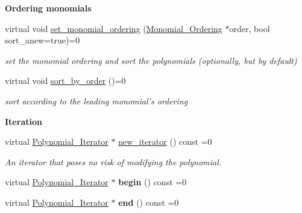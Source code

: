 \begin{Indent}\textbf{ Ordering monomials}\par
\begin{DoxyCompactItemize}
\item 
virtual void \hyperlink{class_abstract___polynomial_ad783804725a64f09fff6eeec058afe98}{set\+\_\+monomial\+\_\+ordering} (\hyperlink{class_monomial___ordering}{Monomial\+\_\+\+Ordering} $\ast$order, bool sort\+\_\+anew=true)=0
\begin{DoxyCompactList}\small\item\em set the monomial ordering and sort the polynomials (optionally, but by default) \end{DoxyCompactList}\item 
virtual void \hyperlink{class_abstract___polynomial_a1fcdd29c324c660ea935197c39e682f2}{sort\+\_\+by\+\_\+order} ()=0
\begin{DoxyCompactList}\small\item\em sort according to the leading monomial's ordering \end{DoxyCompactList}\end{DoxyCompactItemize}
\end{Indent}
\begin{Indent}\textbf{ Iteration}\par
\begin{DoxyCompactItemize}
\item 
\mbox{\label{class_abstract___polynomial_a9cb8460694b7fceaa5a22ae58c73ebe7}} 
virtual \hyperlink{class_polynomial___iterator}{Polynomial\+\_\+\+Iterator} $\ast$ \hyperlink{class_abstract___polynomial_a9cb8460694b7fceaa5a22ae58c73ebe7}{new\+\_\+iterator} () const =0
\begin{DoxyCompactList}\small\item\em An iterator that poses no risk of modifying the polynomial. \end{DoxyCompactList}\item 
\mbox{\label{class_abstract___polynomial_ad8da27c2d5e41d6e81d15d756eebf868}} 
virtual \hyperlink{class_polynomial___iterator}{Polynomial\+\_\+\+Iterator} $\ast$ {\bfseries begin} () const =0
\item 
\mbox{\label{class_abstract___polynomial_aa769b074a39e5eac6526101d77e2e53f}} 
virtual \hyperlink{class_polynomial___iterator}{Polynomial\+\_\+\+Iterator} $\ast$ {\bfseries end} () const =0
\end{DoxyCompactItemize}
\end{Indent}
